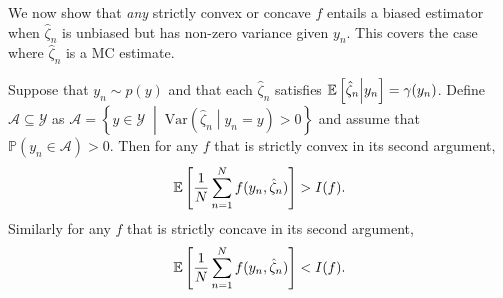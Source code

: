 %
%
We now show that 
\emph{any}
strictly convex or concave $f$ entails a biased estimator 
when $\hat{\zeta}_n$ is unbiased but has non-zero variance
given $y_n$. This covers the
case where $\hat{\zeta}_n$ is a MC estimate.
\begin{theorem}
  \label{the:bias-conv}	
  Suppose that $y_n \sim p(y)$ and that each $\hat{\zeta}_n$ satisfies $\mathbb{E} \left[\hat{\zeta}_n \middle| y_n\right] = \gamma(y_n)$.
  Define $\mathcal{A} \subseteq \mathcal{Y}$ as
  $\mathcal{A} = \left\{y \in \mathcal{Y} \;\middle|\; \mathrm{Var}\left(\hat{\zeta}_n \middle| y_n=y \right)>0\right\}$
  and assume that ~$\mathbb{P}(y_n \in \mathcal{A}) > 0$.
  Then for any $f$ that is strictly convex in its second argument,
	\[ 
	\mathbb{E}\left[\frac{1}{N} \sum_{n=1}^N f(y_n, \hat{\zeta}_n)\right] > I(f).
	\]
  Similarly for any $f$ that is strictly concave in its second argument, 
	\[
		\mathbb{E}\left[\frac{1}{N} \sum_{n=1}^N f(y_n, \hat{\zeta}_n)\right] < I(f).
	\]
\end{theorem}
